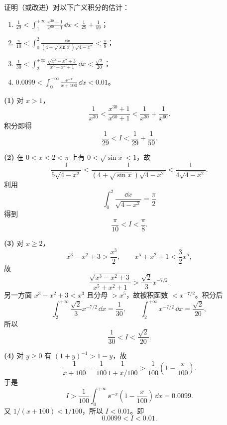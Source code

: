 \begin{xreferenceproblem}[2]
证明（或改进）对以下广义积分的估计：
  \begin{enumerate}[label=(\arabic*)]
    \item $\displaystyle\frac1{29}<\int_1^{+\infty}\frac{x^{30}+1}{x^{60}+1}\,\dd x<\frac1{29}+\frac1{59}$；
    \item $\displaystyle\frac\pi{10}<\int_0^2\frac{\dd x}{(4+\sqrt{\sin x})\sqrt{4-x^2}}<\frac\pi8$；
    \item $\displaystyle\frac1{30}<\int_2^{+\infty}\frac{\sqrt{x^3-x^2+3}}{x^5+x^2+1}\,\dd x<\frac{\sqrt2}{20}$；
    \item $\displaystyle0.0099<\int_0^{+\infty}\frac{\ee^{-x}}{x+100}\,\dd x<0.01$。
  \end{enumerate}
\end{xreferenceproblem}
\begin{xsolution}
\textbf{(1)} 对 $x>1$，
\[
  \frac1{x^{30}}<\frac{x^{30}+1}{x^{60}+1}
  <\frac1{x^{30}}+\frac1{x^{60}}.
\]
积分即得
\[
  \boxed{\frac1{29}<I<\frac1{29}+\frac1{59}}.
\]

\textbf{(2)} 在 $0<x<2<\pi$ 上有 $0<\sqrt{\sin x}<1$，故
\[
  \frac1{5\sqrt{4-x^2}}
  <\frac1{(4+\sqrt{\sin x})\sqrt{4-x^2}}
  <\frac1{4\sqrt{4-x^2}}.
\]
利用
\[
  \int_0^2\frac{\dd x}{\sqrt{4-x^2}}=\frac\pi2
\]
得到
\[
  \boxed{\frac\pi{10}<I<\frac\pi8}.
\]

\textbf{(3)} 对 $x\geq2$，
\[
  x^3-x^2+3>\frac{x^3}{2},
  \qquad
  x^5+x^2+1<\frac32x^5,
\]
故
\[
  \frac{\sqrt{x^3-x^2+3}}{x^5+x^2+1}
  >\frac{\sqrt2}{3}x^{-7/2}.
\]
另一方面 $x^3-x^2+3<x^3$ 且分母 $>x^5$，故被积函数 $<x^{-7/2}$。积分后
\[
  \int_2^{+\infty}\frac{\sqrt2}{3}x^{-7/2}\,\dd x=\frac1{30},
  \qquad
  \int_2^{+\infty}x^{-7/2}\,\dd x=\frac{\sqrt2}{20},
\]
所以
\[
  \boxed{\frac1{30}<I<\frac{\sqrt2}{20}}.
\]

\textbf{(4)} 对 $y\geq0$ 有 $(1+y)^{-1}>1-y$，故
\[
  \frac1{x+100}=\frac1{100}\frac1{1+x/100}
  >\frac1{100}\left(1-\frac{x}{100}\right).
\]
于是
\[
  I>\frac1{100}\int_0^{+\infty}\ee^{-x}\left(1-\frac{x}{100}\right)\,\dd x
  =0.0099.
\]
又 $1/(x+100)<1/100$，所以 $I<0.01$。即
\[
  \boxed{0.0099<I<0.01}.
\]
\end{xsolution}


